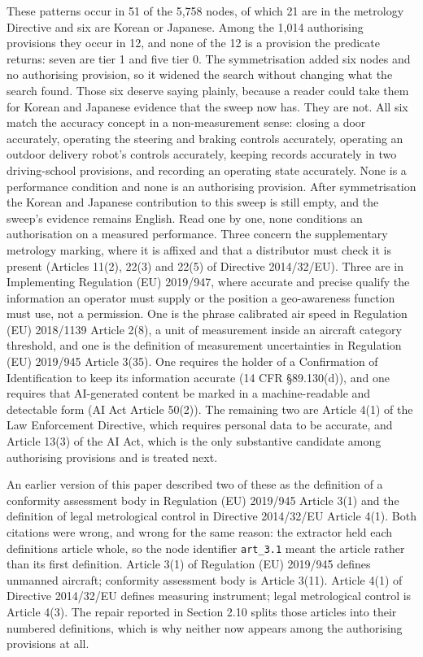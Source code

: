 These patterns occur in 51 of the 5,758 nodes, of which 21 are in the metrology Directive and six are Korean or Japanese. Among the 1,014 authorising provisions they occur in 12, and none of the 12 is a provision the predicate returns: seven are tier 1 and five tier 0. The symmetrisation added six nodes and no authorising provision, so it widened the search without changing what the search found. Those six deserve saying plainly, because a reader could take them for Korean and Japanese evidence that the sweep now has. They are not. All six match the accuracy concept in a non-measurement sense: closing a door accurately, operating the steering and braking controls accurately, operating an outdoor delivery robot's controls accurately, keeping records accurately in two driving-school provisions, and recording an operating state accurately. None is a performance condition and none is an authorising provision. After symmetrisation the Korean and Japanese contribution to this sweep is still empty, and the sweep's evidence remains English. Read one by one, none conditions an authorisation on a measured performance. Three concern the supplementary metrology marking, where it is affixed and that a distributor must check it is present (Articles 11(2), 22(3) and 22(5) of Directive 2014/32/EU). Three are in Implementing Regulation (EU) 2019/947, where accurate and precise qualify the information an operator must supply or the position a geo-awareness function must use, not a permission. One is the phrase calibrated air speed in Regulation (EU) 2018/1139 Article 2(8), a unit of measurement inside an aircraft category threshold, and one is the definition of measurement uncertainties in Regulation (EU) 2019/945 Article 3(35). One requires the holder of a Confirmation of Identification to keep its information accurate (14 CFR \S{}89.130(d)), and one requires that AI-generated content be marked in a machine-readable and detectable form (AI Act Article 50(2)). The remaining two are Article 4(1) of the Law Enforcement Directive, which requires personal data to be accurate, and Article 13(3) of the AI Act, which is the only substantive candidate among authorising provisions and is treated next.

An earlier version of this paper described two of these as the definition of a conformity assessment body in Regulation (EU) 2019/945 Article 3(1) and the definition of legal metrological control in Directive 2014/32/EU Article 4(1). Both citations were wrong, and wrong for the same reason: the extractor held each definitions article whole, so the node identifier \texttt{art\_3.1} meant the article rather than its first definition. Article 3(1) of Regulation (EU) 2019/945 defines unmanned aircraft; conformity assessment body is Article 3(11). Article 4(1) of Directive 2014/32/EU defines measuring instrument; legal metrological control is Article 4(3). The repair reported in Section 2.10 splits those articles into their numbered definitions, which is why neither now appears among the authorising provisions at all.


